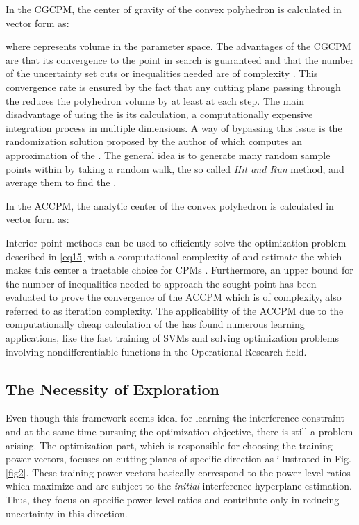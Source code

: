 \documentclass[journal]{IEEEtran}
\begin{document}
In the CGCPM, the center of gravity  of the convex polyhedron  is calculated in vector form as:


where  represents volume in the parameter  space. The advantages of the CGCPM are that its convergence to the point in search is guaranteed and that the number of the uncertainty set cuts or inequalities needed are of  complexity \cite{biban86}. This convergence rate is ensured by the fact that any cutting plane passing through the  reduces the polyhedron volume by at least  at each step. The main disadvantage of using the  is its calculation, a computationally expensive integration process in multiple dimensions. A way of bypassing this issue is the randomization solution proposed by the author of \cite{biban94} which computes an approximation of the . The general idea is to generate many random sample points within  by taking a random walk, the so called \textit{Hit and Run} method, and average them to find the .

In the ACCPM, the analytic center  of the convex polyhedron  is calculated in vector form as:


Interior point methods can be used to efficiently solve the optimization problem described in \eqref{eq15} with a computational complexity of  and estimate the  which makes this center a tractable choice for CPMs \cite{biban91}. Furthermore, an upper bound for the number of inequalities needed to approach the sought point has been evaluated to prove the convergence of the ACCPM which is of  complexity, also referred to as iteration complexity. The applicability of the ACCPM due to the computationally cheap calculation of the  has found numerous learning applications, like the fast training of SVMs and solving optimization problems involving nondifferentiable functions in the Operational Research field.

\subsection{The Necessity of Exploration}

Even though this framework seems ideal for learning the interference constraint and at the same time pursuing the optimization objective, there is still a problem arising. The optimization part, which is responsible for choosing the training power vectors, focuses on cutting planes of specific direction as illustrated in Fig. \ref{fig2}. These training power vectors basically correspond to the power level ratios which maximize  and are subject to the \textit{initial} interference hyperplane estimation. Thus, they focus on specific power level ratios and contribute only in reducing uncertainty in this direction.
\end{document}
